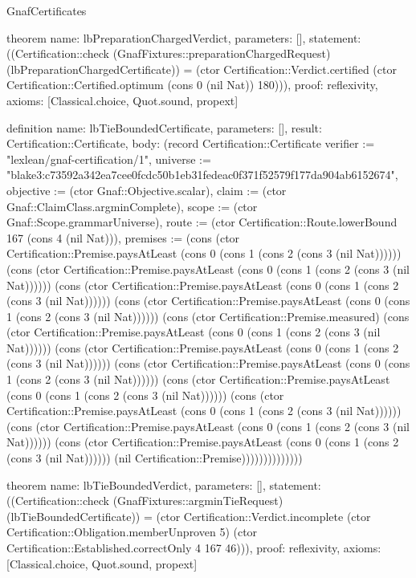 \begin{lexlean}{GnafCertificates}
\begin{semanticmodule}
theorem{
  name: lbPreparationChargedVerdict,
  parameters: [],
  statement: ((Certification::check (GnafFixtures::preparationChargedRequest) (lbPreparationChargedCertificate)) = (ctor Certification::Verdict.certified (ctor Certification::Certified.optimum (cons 0 (nil Nat)) 180))),
  proof: reflexivity{},
  axioms: [Classical.choice, Quot.sound, propext]
}

definition{
  name: lbTieBoundedCertificate,
  parameters: [],
  result: Certification::Certificate,
  body: (record Certification::Certificate {verifier := "lexlean/gnaf-certification/1", universe := "blake3:c73592a342ea7cee0fcdc50b1eb31fedeac0f371f52579f177da904ab6152674", objective := (ctor Gnaf::Objective.scalar), claim := (ctor Gnaf::ClaimClass.argminComplete), scope := (ctor Gnaf::Scope.grammarUniverse), route := (ctor Certification::Route.lowerBound 167 (cons 4 (nil Nat))), premises := (cons (ctor Certification::Premise.paysAtLeast (cons 0 (cons 1 (cons 2 (cons 3 (nil Nat)))))) (cons (ctor Certification::Premise.paysAtLeast (cons 0 (cons 1 (cons 2 (cons 3 (nil Nat)))))) (cons (ctor Certification::Premise.paysAtLeast (cons 0 (cons 1 (cons 2 (cons 3 (nil Nat)))))) (cons (ctor Certification::Premise.paysAtLeast (cons 0 (cons 1 (cons 2 (cons 3 (nil Nat)))))) (cons (ctor Certification::Premise.measured) (cons (ctor Certification::Premise.paysAtLeast (cons 0 (cons 1 (cons 2 (cons 3 (nil Nat)))))) (cons (ctor Certification::Premise.paysAtLeast (cons 0 (cons 1 (cons 2 (cons 3 (nil Nat)))))) (cons (ctor Certification::Premise.paysAtLeast (cons 0 (cons 1 (cons 2 (cons 3 (nil Nat)))))) (cons (ctor Certification::Premise.paysAtLeast (cons 0 (cons 1 (cons 2 (cons 3 (nil Nat)))))) (cons (ctor Certification::Premise.paysAtLeast (cons 0 (cons 1 (cons 2 (cons 3 (nil Nat)))))) (cons (ctor Certification::Premise.paysAtLeast (cons 0 (cons 1 (cons 2 (cons 3 (nil Nat)))))) (cons (ctor Certification::Premise.paysAtLeast (cons 0 (cons 1 (cons 2 (cons 3 (nil Nat)))))) (nil Certification::Premise)))))))))))))})
}

theorem{
  name: lbTieBoundedVerdict,
  parameters: [],
  statement: ((Certification::check (GnafFixtures::argminTieRequest) (lbTieBoundedCertificate)) = (ctor Certification::Verdict.incomplete (ctor Certification::Obligation.memberUnproven 5) (ctor Certification::Established.correctOnly 4 167 46))),
  proof: reflexivity{},
  axioms: [Classical.choice, Quot.sound, propext]
}


\end{semanticmodule}
\end{lexlean}
